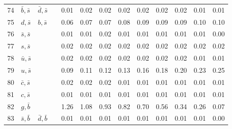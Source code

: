 \begin{tabularx}{\textwidth}{rXXX@{}S@{}S@{}S@{}S@{}S@{}S@{}S@{}S@{}S}
 74 & $\bar b, \bar s$ & $\bar d, \bar s$  &                  &  0.01 &  0.02 &  0.02 &  0.02 &  0.02 &  0.02 &  0.02 &  0.01 &  0.01 \\
 75 & $d, \bar s$      & $b, \bar s$       &                  &  0.06 &  0.07 &  0.07 &  0.08 &  0.09 &  0.09 &  0.09 &  0.10 &  0.10 \\
 76 & $\bar s, \bar s$ &                   &                  &  0.01 &  0.01 &  0.02 &  0.01 &  0.01 &  0.01 &  0.01 &  0.01 &  0.00 \\
 77 & $s, \bar s$      &                   &                  &  0.02 &  0.02 &  0.02 &  0.02 &  0.02 &  0.02 &  0.02 &  0.02 &  0.02 \\
 78 & $\bar u, \bar s$ &                   &                  &  0.02 &  0.02 &  0.02 &  0.02 &  0.02 &  0.02 &  0.02 &  0.01 &  0.01 \\
 79 & $u, \bar s$      &                   &                  &  0.09 &  0.11 &  0.12 &  0.13 &  0.16 &  0.18 &  0.20 &  0.23 &  0.25 \\
 80 & $\bar c, \bar s$ &                   &                  &  0.02 &  0.02 &  0.02 &  0.01 &  0.01 &  0.01 &  0.01 &  0.01 &  0.01 \\
 81 & $c, \bar s$      &                   &                  &  0.01 &  0.01 &  0.01 &  0.01 &  0.01 &  0.01 &  0.01 &  0.01 &  0.01 \\
 82 & $g, \bar b$      &                   &                  &  1.26 &  1.08 &  0.93 &  0.82 &  0.70 &  0.56 &  0.34 &  0.26 &  0.07 \\
 83 & $\bar s, \bar b$ & $\bar d, \bar b$  &                  &  0.01 &  0.01 &  0.01 &  0.01 &  0.01 &  0.01 &  0.01 &  0.01 &  0.00 \\
\bottomrule
\end{tabularx}
